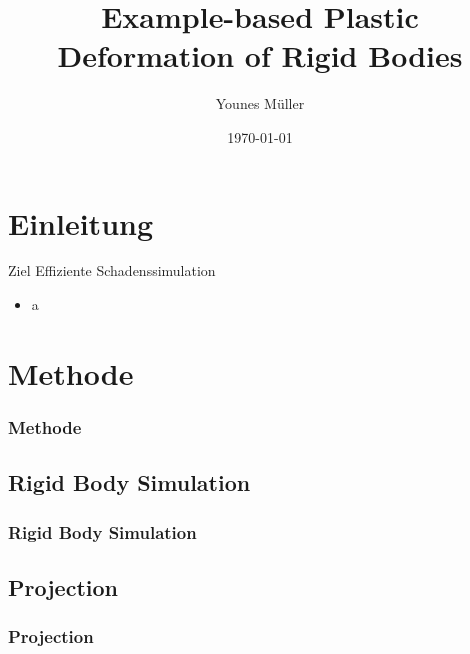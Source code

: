 \documentclass{beamer}
\begin{document}
	\title{Example-based Plastic Deformation of Rigid Bodies}   
	\author{Younes Müller} 
	\date{\today} 
	
	\frame{\titlepage} 
	
	
	\section{Einleitung}
	\begin{frame}
		\begin{block}{Ziel}
			Effiziente Schadenssimulation
		\end{block}
		\begin{itemize}
			\item a
		\end{itemize}
	\end{frame}
	\section{Methode}
	\begin{frame}
		\frametitle{Methode}
	\end{frame}
	\subsection{Rigid Body Simulation}
	\begin{frame}
		\frametitle{Rigid Body Simulation}
	\end{frame}
	\subsection{Projection}
	\begin{frame}
		\frametitle{Projection}
	\end{frame}
\end{document}
